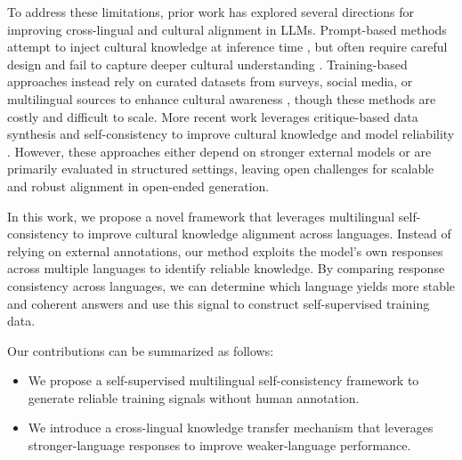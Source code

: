 \documentclass[11pt]{article}
\begin{document}
To address these limitations, prior work has explored several directions for improving cross-lingual and cultural alignment in LLMs. Prompt-based methods attempt to inject cultural knowledge at inference time \cite{wang-etal-2024-countries}, but often require careful design and fail to capture deeper cultural understanding \cite{durmustowards, kovavc2023large}. Training-based approaches instead rely on curated datasets from surveys, social media, or multilingual sources to enhance cultural awareness \cite{li2024culturellm, shi-etal-2024-culturebank, adilazuarda-etal-2025-surveys}, though these methods are costly and difficult to scale. More recent work leverages critique-based data synthesis and self-consistency to improve cultural knowledge and model reliability \cite{feng-etal-2025-culfit, wang-etal-2025-calm}. However, these approaches either depend on stronger external models or are primarily evaluated in structured settings, leaving open challenges for scalable and robust alignment in open-ended generation.

In this work, we propose a novel framework that leverages multilingual self-consistency to improve cultural knowledge alignment across languages. Instead of relying on external annotations, our method exploits the model’s own responses across multiple languages to identify reliable knowledge. By comparing response consistency across languages, we can determine which language yields more stable and coherent answers and use this signal to construct self-supervised training data.


Our contributions can be summarized as follows:
\begin{itemize}
    \item We propose a self-supervised multilingual self-consistency framework to generate reliable training signals without human annotation.
    \item We introduce a cross-lingual knowledge transfer mechanism that leverages stronger-language responses to improve weaker-language performance.
\end{itemize}
\end{document}
